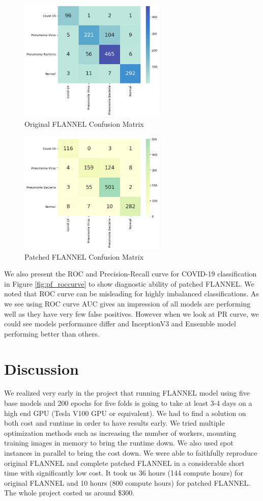 \documentclass{sigkddExp}
\begin{document}
\begin{figure}[h]
    \centering
    \includegraphics[width=7cm]{../doc/images/base_flannel_cf.png}
    \caption{Original FLANNEL Confusion Matrix}
    \label{fig:f_cf}
\end{figure}


\begin{figure}[h]
    \centering
    \includegraphics[width=7cm]{../doc/images/patched_flannel_cf.png}
    \caption{Patched FLANNEL Confusion Matrix}
    \label{fig:p_cf}
\end{figure}

We also present the ROC and Precision-Recall curve for COVID-19 classification
in Figure \ref{fig:pf_roccurve} to show diagnostic ability of patched FLANNEL.
We noted that ROC curve can be misleading for highly imbalanced classifications.
As we see using ROC curve AUC gives an impression of all models are performing
well as they have very few false positives. However when we look at PR curve, we
could see models performance differ and InceptionV3 and Ensemble model
performing better than others.


\section{Discussion}

We realized very early in the project that running FLANNEL model using five base
models and 200 epochs for five folds is going to take at least 3-4 days on a
high end GPU (Tesla V100 GPU or equivalent). We had to find a solution on both
cost and runtime in order to have results early. We tried multiple optimization
methods such as increasing the number of workers, mounting training images in
memory to bring the runtime down. We also used spot instances in parallel to
bring the cost down. We were able to faithfully reproduce original FLANNEL and
complete patched FLANNEL in a considerable short time with significantly low
cost. It took us 36 hours (144 compute hours) for original FLANNEL and 10 hours
(800 compute hours) for patched FLANNEL. The whole project costed us around
\$300.
\end{document}
